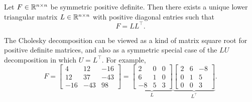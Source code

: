 \begin{definition}
    Let $F \in \mathbb{R}^{n \times n}$ be symmetric positive definite. Then there exists a unique lower triangular matrix $L \in \mathbb{R}^{n \times n}$ with positive diagonal entries such that
    \begin{equation*}
        F = LL^\top.
    \end{equation*}
\end{definition}
The Cholesky decomposition can be viewed as a kind of matrix square root for positive definite matrices, and also as a symmetric special case of the $LU$ decomposition in which $U = L^\top$. For example,
\begin{equation*}
    F = \begin{bmatrix}
        4 & 12 & -16 \\
        12 & 37 & -43 \\
        -16 & -43 & 98
    \end{bmatrix}
    =
    \underbrace{\begin{bmatrix}
        2 & 0 & 0 \\
        6 & 1 & 0 \\
        -8 & 5 & 3
    \end{bmatrix}}_{L}
    \underbrace{\begin{bmatrix}
        2 & 6 & -8 \\
        0 & 1 & 5 \\
        0 & 0 & 3
    \end{bmatrix}}_{L^\top}.
\end{equation*}

